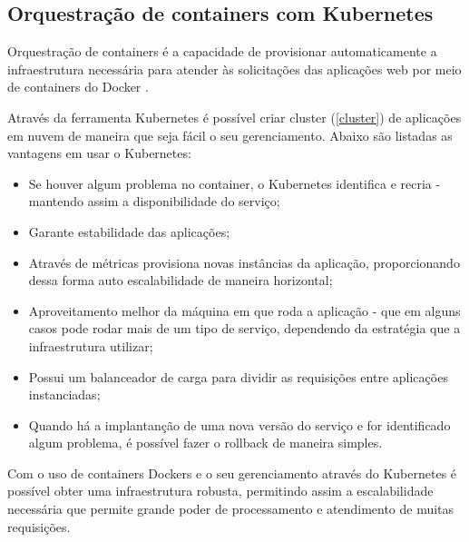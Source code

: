 \subsection{Orquestração de containers com Kubernetes}\label{kubernetes}

\begin{citacao}
Orquestração de containers é a capacidade de provisionar automaticamente
a infraestrutura necessária para atender às solicitações das aplicações web
por meio de containers do Docker \cite{docker-kubernetes-e-openshift}.
\end{citacao}

Através da ferramenta Kubernetes é possível criar cluster (\autoref{cluster})
de aplicações em nuvem de maneira que seja fácil o seu gerenciamento.
Abaixo são listadas as vantagens em usar o Kubernetes:

\begin{itemize}

	\item Se houver algum problema no container, o Kubernetes identifica e recria -
          mantendo assim a disponibilidade do serviço;
    \item Garante estabilidade das aplicações;
    \item Através de métricas provisiona novas instâncias da aplicação,
          proporcionando dessa forma auto escalabilidade de maneira horizontal;
    \item Aproveitamento melhor da máquina em que roda a aplicação - que em alguns
          casos pode rodar mais de um tipo de serviço, dependendo da estratégia
          que a infraestrutura utilizar;
    \item Possui um balanceador de carga para dividir as requisições entre
          aplicações instanciadas;
    \item Quando há a implantanção de uma nova versão do serviço e for identificado
          algum problema, é possível fazer o rollback de maneira simples.

\end{itemize}

Com o uso de containers Dockers e o seu gerenciamento através do Kubernetes é possível
obter uma infraestrutura robusta, permitindo assim a escalabilidade necessária que permite
grande poder de processamento e atendimento de muitas requisições.

%
